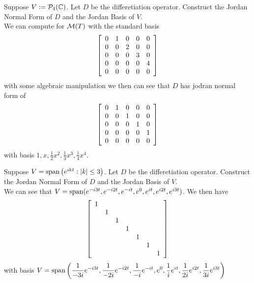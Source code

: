 \begin{example}
	Suppose $V:= \mathcal P_4(\mathbb C)$. Let $D$ be the differetiation operator. Construct the Jordan Normal Form of $D$ and the Jordan Basis of $V$. \\
	We can compute for $\mathcal M(T)$ with the standard basis
	\[ \left[ \begin{array}{ccccccccccccccccccccccccccccccccccccccccccccccccccccccccccc} 
		0 & 1 & 0 & 0 & 0 \\
		0 & 0 & 2 & 0 & 0 \\
		0 & 0 & 0 & 3 & 0 \\
		0 & 0 & 0 & 0 & 4 \\
		0 & 0 & 0 & 0 & 0 		
	\end{array} \right]\]
	with some algebraic manipulation we then can see that $D$ has jodran normal form of
	\[ \left[ \begin{array}{ccccccccccccccccccccccccccccccccccccccccccccccccccccccccccc} 
		0 & 1 & 0 & 0 & 0 \\
		0 & 0 & 1 & 0 & 0 \\
		0 & 0 & 0 & 1 & 0 \\
		0 & 0 & 0 & 0 & 1 \\
		0 & 0 & 0 & 0 & 0 		
	\end{array} \right]\]
	with basis $\displaystyle 1, x, \frac 12 x^2, \frac 13 x^3, \frac 14 x^4$.
\end{example}
\begin{example}
	Suppose $V = \text{span} \left( e^{ikt} : |k| \leq 3 \right)$. Let $D$ be the differetiation operator. Construct the Jordan Normal Form of $D$ and the Jordan Basis of $V$. \\
	We can see that $V = \text{span} (e^{-i3t},e^{-i2t},e^{-it},e^{0},e^{it},e^{i2t},e^{i3t})$. 
	We then have 
	\[ \left[ \begin{array}{ccccccccccccccccccccccccccccccccccccccccccccccccccccccccccc} 1 \\
	& 1 \\
	&& 1 \\
	&&& 1 \\
	&&&& 1 \\
	&&&&& 1 \\
	&&&&&& 1 \end{array} \right]\]
	with basis $\displaystyle V = \text{span} \left(\frac{1}{-3i} e^{-i3t}, \frac{1}{-2i}e^{-i2t},\frac{1}{-i}e^{-it}, e^{0}, \frac{1}{i}e^{it}, \frac{1}{2i}e^{i2t}, \frac{1}{3i}e^{i3t}\right)$
\end{example}
\newpage

